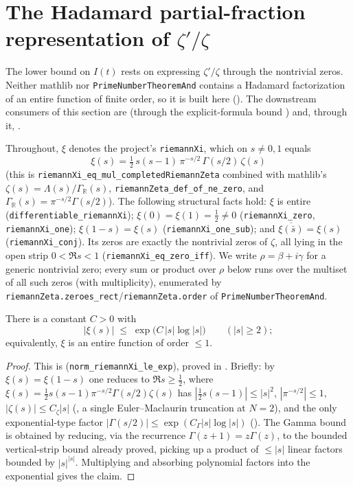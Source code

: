 \section{The Hadamard partial-fraction representation of
\texorpdfstring{$\zeta'/\zeta$}{ζ'/ζ}}
\label{sec:lb_pf}

The lower bound on $I(t)$ rests on expressing $\zeta'/\zeta$ through the nontrivial
zeros. Neither mathlib nor \texttt{PrimeNumberTheoremAnd} contains a Hadamard
factorization of an entire function of finite order, so it is built here
(). The downstream consumers of this section are
 (through the explicit-formula bound
) and, through it, .

Throughout, $\xi$ denotes the project's \texttt{riemannXi}, which on
$s\neq0,1$ equals
\[
  \xi(s) = \tfrac12\,s(s-1)\,\pi^{-s/2}\,\Gamma(s/2)\,\zeta(s)
\]
(this is \texttt{riemannXi\_eq\_mul\_completedRiemannZeta} combined with mathlib's
$\zeta(s)=\Lambda(s)/\Gamma_{\mathbb R}(s)$, \texttt{riemannZeta\_def\_of\_ne\_zero},
and $\Gamma_{\mathbb R}(s)=\pi^{-s/2}\Gamma(s/2)$). The following structural facts
hold: $\xi$ is entire (\texttt{differentiable\_riemannXi});
$\xi(0)=\xi(1)=\tfrac12\neq0$ (\texttt{riemannXi\_zero}, \texttt{riemannXi\_one});
$\xi(1-s)=\xi(s)$ (\texttt{riemannXi\_one\_sub}); and
$\overline{\xi(\bar s)}=\xi(s)$ (\texttt{riemannXi\_conj}). Its zeros are exactly
the nontrivial zeros of $\zeta$, all lying in the open strip $0<\Re s<1$
(\texttt{riemannXi\_eq\_zero\_iff}). We write $\rho=\beta+i\gamma$ for a generic
nontrivial zero; every sum or product over $\rho$ below runs over the multiset of
all such zeros (with multiplicity), enumerated by
\texttt{riemannZeta.zeroes\_rect}/\texttt{riemannZeta.order} of
\texttt{PrimeNumberTheoremAnd}.

\begin{lemma}
\label{lem:lb_pf_order}
\leanok
{}
There is a constant $C>0$ with
\[
  |\xi(s)|\;\le\;\exp\!\bigl(C\,|s|\log|s|\bigr)\qquad(|s|\ge2);
\]
equivalently, $\xi$ is an entire function of order $\le1$.
\end{lemma}

\begin{proof}
\leanok
{}
This is  (\texttt{norm\_riemannXi\_le\_exp}), proved
in . Briefly: by
$\xi(s)=\xi(1-s)$ one reduces to $\Re s\ge\tfrac12$, where
$\xi(s)=\tfrac12 s(s-1)\pi^{-s/2}\Gamma(s/2)\zeta(s)$ has $|\tfrac12 s(s-1)|\le|s|^2$,
$|\pi^{-s/2}|\le1$, $|\zeta(s)|\le C_\zeta|s|$ (, a single
Euler--Maclaurin truncation at $N=2$), and the only exponential-type factor
$|\Gamma(s/2)|\le\exp(C_\Gamma|s|\log|s|)$ (). The Gamma
bound is obtained by reducing, via the recurrence $\Gamma(z+1)=z\Gamma(z)$, to the
bounded vertical-strip bound
 already proved, picking up a product of $\le|s|$ linear
factors bounded by $|s|^{|s|}$. Multiplying and absorbing polynomial factors into the
exponential gives the claim.
\end{proof}

